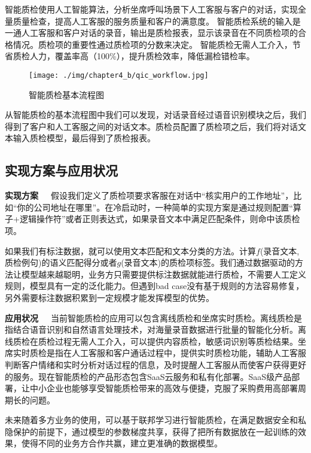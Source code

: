 智能质检使用人工智能算法，分析坐席呼叫场景下人工客服与客户的对话，实现全量质量检查，提高人工客服的服务质量和客户的满意度。
智能质检系统的输入是一通人工客服和客户对话的录音，输出是质检报表，显示该录音在不同质检项的合格情况。质检项的重要性通过质检项的分数来决定。
智能质检无需人工介入，节省质检人力，覆盖率高（100\%），提升质检效率，降低漏检错检率。
\begin{figure}[h]
\centering
\texttt{[image: ./img/chapter4\_b/qic\_workflow.jpg]}
\caption{智能质检基本流程图}
\label{fig1}
\end{figure}

从智能质检的基本流程图中我们可以发现，对话录音经过语音识别模块之后，我们得到了客户和人工客服之间的对话文本。质检员配置了质检项之后，我们将对话文本输入质检模型，最后得到了质检报表。
\subsection{实现方案与应用状况}
\textbf{实现方案}~~~假设我们定义了质检项要求客服在对话中“核实用户的工作地址”，比如“你的公司地址在哪里”。在冷启动时，一种简单的实现方案是通过规则配置“算子+逻辑操作符”或者正则表达式，如果录音文本中满足匹配条件，则命中该质检项。

如果我们有标注数据，就可以使用文本匹配和文本分类的方法。计算$f$(录音文本,质检例句)的语义匹配得分或者$g$(录音文本)的质检项标签。我们通过数据驱动的方法让模型越来越聪明，业务方只需要提供标注数据就能进行质检，不需要人工定义规则，模型具有一定的泛化能力。但遇到bad case没有基于规则的方法容易修复，另外需要标注数据积累到一定规模才能发挥模型的优势。

\textbf{应用状况}~~~当前智能质检的应用可以包含离线质检和坐席实时质检。离线质检是指结合语音识别和自然语言处理技术，对海量录音数据进行批量的智能化分析。离线质检在质检过程无需人工介入，可以提供内容质检，敏感词识别等质检结果。坐席实时质检是指在人工客服和客户通话过程中，提供实时质检功能，辅助人工客服判断客户情绪和实时分析对话过程的信息，及时提醒人工客服从而使客户获得更好的服务。现在智能质检的产品形态包含SaaS云服务和私有化部署。SaaS级产品部署，让中小企业也能够享受智能质检带来的高效与便捷，克服了采购费用高部署周期长的问题。

未来随着多方业务的使用，可以基于联邦学习进行智能质检，在满足数据安全和私隐保护的前提下，通过模型的参数梯度共享，获得了把所有数据放在一起训练的效果，使得不同的业务方合作共赢，建立更准确的数据模型。

